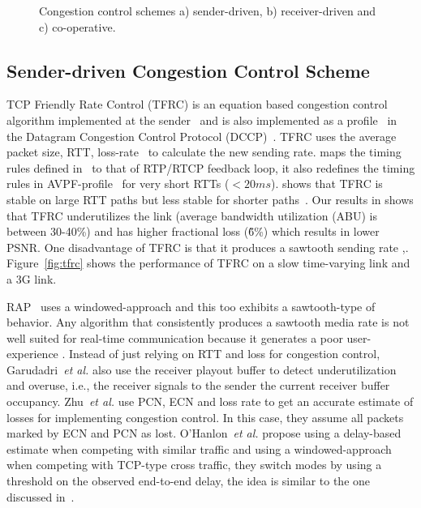 \begin{figure}
  \centerline{
  }
  \centerline{
  }
  \centerline{
  }
  \caption{Congestion control schemes a) sender-driven, b) receiver-driven
and c) co-operative.}
  \label{fig:cc:scheme}
\end{figure}


\subsection{Sender-driven Congestion Control Scheme}

TCP Friendly Rate Control (TFRC) is an equation based congestion control
algorithm implemented at the sender~\cite{tfrc_347397} and is also implemented
as a profile~\cite{rfc4342} in the Datagram Congestion Control Protocol
(DCCP)~\cite{rfc4340}. TFRC uses the average packet size, RTT,
loss-rate~\cite{rfc3448} to calculate the new sending rate.
\cite{draft.rtp.tfrc} maps the timing rules defined in~\cite{rfc4828, rfc5348}
to that of RTP/RTCP feedback loop, it also redefines the timing rules in
AVPF-profile~\cite{rfc4585} for very short RTTs ($<20ms$).
\cite{Gharai06:ICME} shows that TFRC is stable on large RTT paths but less
stable for shorter paths~\cite{saurin:2006:thesis}. Our results in
 shows that TFRC underutilizes the link (average bandwidth
utilization (ABU) is between 30-40\%) and has higher fractional loss (\~6\%)
which results in lower PSNR. One disadvantage of TFRC is that it produces a
sawtooth sending rate \cite{saurin:2006:thesis},.
Figure~\ref{fig:tfrc} shows the performance of TFRC on a slow time-varying
link and a 3G link.

RAP~\cite{rap:752152} uses a windowed-approach and this too exhibits a
sawtooth-type of behavior. Any algorithm that consistently produces a sawtooth
media rate is not well suited for real-time communication because it generates
a poor user-experience \cite{Gharai:2002wt,VladBalan:2007dq,
Zink03subjectiveimpression}. Instead of just relying on RTT and loss for
congestion control, Garudadri~\textit{et al.}\cite{4397059} also use the
receiver playout buffer to detect underutilization and overuse, i.e., the
receiver signals to the sender the current receiver buffer occupancy.
Zhu~\textit{et al.}\cite{rmcat-nada} use PCN, ECN and loss rate to get an
accurate estimate of losses for implementing congestion control. In this case,
they assume all packets marked by ECN and PCN as lost. O'Hanlon~\textit{et
al.}\cite{rmcat-dflow} propose using a delay-based estimate when competing
with similar traffic and using a windowed-approach when competing with
TCP-type cross traffic, they switch modes by using a threshold on the observed
end-to-end delay, the idea is similar to the one discussed
in~\cite{budzisz2011fair}.

